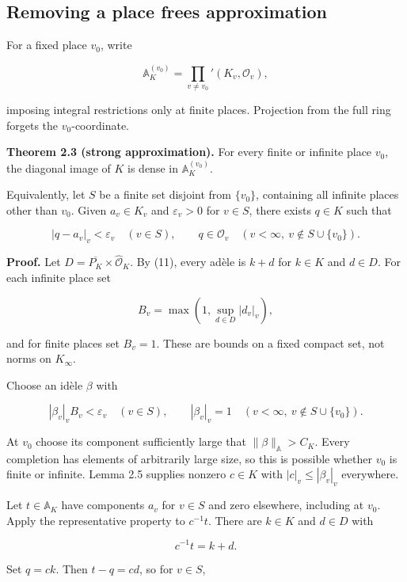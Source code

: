 \documentclass[
  english,
  11pt,
  a4paper,
]{article}
\begin{document}
\subsection{Removing a place frees
approximation}\label{NT-ADL-02--removing-a-place-frees-approximation}

For a fixed place \(v_0\), write

\[\mathbb A_K^{(v_0)}
=\prod_{v\ne v_0}'(K_v,\mathcal O_v),\]

imposing integral restrictions only at finite places. Projection from
the full ring forgets the \(v_0\)-coordinate.

\textbf{Theorem 2.3 (strong approximation).} For every finite or
infinite place \(v_0\), the diagonal image of \(K\) is dense in
\(\mathbb A_K^{(v_0)}\).

Equivalently, let \(S\) be a finite set disjoint from \(\{v_0\}\),
containing all infinite places other than \(v_0\). Given \(a_v\in K_v\)
and \(\varepsilon_v>0\) for \(v\in S\), there exists \(q\in K\) such
that

\[|q-a_v|_v<\varepsilon_v\quad(v\in S),
\qquad
q\in\mathcal O_v\quad(v<\infty,\ v\notin S\cup\{v_0\}).
\tag{20}\]

\textbf{Proof.} Let \(D=\overline{P_K}\times\widehat{\mathcal O}_K\). By
(11), every adèle is \(k+d\) for \(k\in K\) and \(d\in D\). For each
infinite place set

\[B_v=\max\left(1,\sup_{d\in D}|d_v|_v\right),\]

and for finite places set \(B_v=1\). These are bounds on a fixed compact
set, not norms on \(K_\infty\).

Choose an idèle \(\beta\) with

\[|\beta_v|_v B_v<\varepsilon_v\quad(v\in S),
\qquad
|\beta_v|_v=1\quad(v<\infty,\ v\notin S\cup\{v_0\}).\]

At \(v_0\) choose its component sufficiently large that
\(\|\beta\|_{\mathbb A}>C_K\). Every completion has elements of
arbitrarily large size, so this is possible whether \(v_0\) is finite or
infinite. Lemma 2.5 supplies nonzero \(c\in K\) with
\(|c|_v\leq|\beta_v|_v\) everywhere.

Let \(t\in\mathbb A_K\) have components \(a_v\) for \(v\in S\) and zero
elsewhere, including at \(v_0\). Apply the representative property to
\(c^{-1}t\). There are \(k\in K\) and \(d\in D\) with

\[c^{-1}t=k+d.\]

Set \(q=ck\). Then \(t-q=cd\), so for \(v\in S\),
\end{document}
